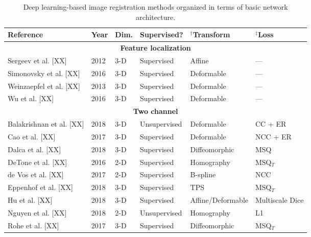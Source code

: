 

\begin{table}[!htb]
\centering
\caption{Deep learning-based image registration methods organized in terms of basic
         network architecture.}
\label{table:methods}
\begin{tabular*}{\textwidth}{l@{\extracolsep{\fill}}l@{\extracolsep{\fill}}l@{\extracolsep{\fill}}l@{\extracolsep{\fill}}l@{\extracolsep{\fill}}l}
\toprule
\midrule
\textbf{Reference} & \textbf{Year} & \textbf{Dim.} & \textbf{Supervised?} & $^\dagger$\textbf{Transform} & $^\ddagger$\textbf{Loss} \\
\midrule
\midrule
\multicolumn{6}{c}{\textbf{Feature localization}}
  \vspace{0.25cm} \\
  Sergeev et al. [XX] & 2012 & 3-D & Supervised & Affine & --- \\
  Simonovsky et al. [XX] & 2016 & 3-D & Supervised & Deformable & --- \\
  Weinzaepfel et al. [XX] & 2013 & 3-D & Supervised & Deformable & --- \\
  Wu et al. [XX] & 2016 & 3-D & Supervised & Deformable & --- \\
\midrule
\multicolumn{6}{c}{\textbf{Two channel}}
  \vspace{0.25cm} \\
  Balakrishnan et al. [XX] & 2018 & 3-D & Unsupervised & Deformable & CC + ER \\
  Cao et al. [XX] & 2017 & 3-D & Supervised & Deformable & NCC + ER \\
  Dalca et al. [XX] & 2018 & 3-D & Supervised & Diffeomorphic & MSQ \\
  DeTone et al. [XX] & 2016 & 2-D & Supervised & Homography & MSQ$_T$ \\ %
  de Vos et al. [XX] & 2017 & 2-D & Supervised & B-spline & NCC \\
  Eppenhof et al. [XX] & 2018 & 3-D & Supervised & TPS & MSQ$_T$ \\       %
  Hu et al. [XX] & 2018 & 3-D & Supervised & Affine/Deformable & Multiscale Dice \\
  Nguyen et al. [XX] & 2018 & 2-D & Unsupervised & Homography & L1 \\
  Rohe et al. [XX] & 2017 & 3-D & Supervised & Diffeomorphic & MSQ$_T$ \\  %

\end{tabular*}
\end{table}

